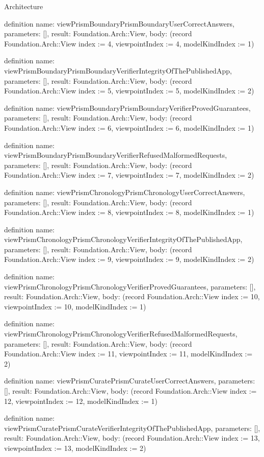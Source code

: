 \begin{lexlean}{Architecture}
\begin{semanticmodule}
definition{
  name: viewPrismBoundaryPrismBoundaryUserCorrectAnswers,
  parameters: [],
  result: Foundation.Arch::View,
  body: (record Foundation.Arch::View {index := 4, viewpointIndex := 4, modelKindIndex := 1})
}

definition{
  name: viewPrismBoundaryPrismBoundaryVerifierIntegrityOfThePublishedApp,
  parameters: [],
  result: Foundation.Arch::View,
  body: (record Foundation.Arch::View {index := 5, viewpointIndex := 5, modelKindIndex := 2})
}

definition{
  name: viewPrismBoundaryPrismBoundaryVerifierProvedGuarantees,
  parameters: [],
  result: Foundation.Arch::View,
  body: (record Foundation.Arch::View {index := 6, viewpointIndex := 6, modelKindIndex := 1})
}

definition{
  name: viewPrismBoundaryPrismBoundaryVerifierRefusedMalformedRequests,
  parameters: [],
  result: Foundation.Arch::View,
  body: (record Foundation.Arch::View {index := 7, viewpointIndex := 7, modelKindIndex := 2})
}

definition{
  name: viewPrismChronologyPrismChronologyUserCorrectAnswers,
  parameters: [],
  result: Foundation.Arch::View,
  body: (record Foundation.Arch::View {index := 8, viewpointIndex := 8, modelKindIndex := 1})
}

definition{
  name: viewPrismChronologyPrismChronologyVerifierIntegrityOfThePublishedApp,
  parameters: [],
  result: Foundation.Arch::View,
  body: (record Foundation.Arch::View {index := 9, viewpointIndex := 9, modelKindIndex := 2})
}

definition{
  name: viewPrismChronologyPrismChronologyVerifierProvedGuarantees,
  parameters: [],
  result: Foundation.Arch::View,
  body: (record Foundation.Arch::View {index := 10, viewpointIndex := 10, modelKindIndex := 1})
}

definition{
  name: viewPrismChronologyPrismChronologyVerifierRefusedMalformedRequests,
  parameters: [],
  result: Foundation.Arch::View,
  body: (record Foundation.Arch::View {index := 11, viewpointIndex := 11, modelKindIndex := 2})
}

definition{
  name: viewPrismCuratePrismCurateUserCorrectAnswers,
  parameters: [],
  result: Foundation.Arch::View,
  body: (record Foundation.Arch::View {index := 12, viewpointIndex := 12, modelKindIndex := 1})
}

definition{
  name: viewPrismCuratePrismCurateVerifierIntegrityOfThePublishedApp,
  parameters: [],
  result: Foundation.Arch::View,
  body: (record Foundation.Arch::View {index := 13, viewpointIndex := 13, modelKindIndex := 2})
}


\end{semanticmodule}
\end{lexlean}
